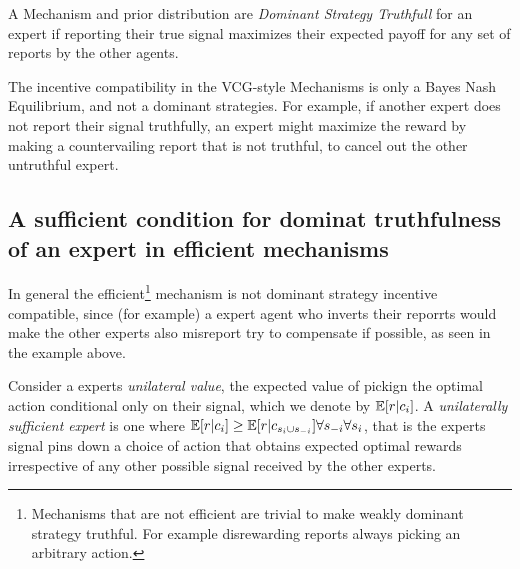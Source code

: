 \begin{defn}
	A Mechanism and prior distribution are \emph{Dominant Strategy Truthfull} for an expert if reporting their true signal maximizes their expected payoff for any set of reports by the other agents. 
\end{defn}

The incentive compatibility in the VCG-style Mechanisms is only a Bayes Nash Equilibrium, and not a dominant strategies. For example, if another expert does not report their signal truthfully, an expert might maximize the reward by making a countervailing report that is not truthful, to cancel out the other untruthful expert. 



\subsection{A sufficient condition for dominat truthfulness of an expert in efficient mechanisms}

In general the efficient\footnote{Mechanisms that are not efficient are trivial to make weakly dominant strategy truthful. For example disrewarding reports always picking an arbitrary action.} mechanism is not dominant strategy incentive compatible, since (for example) a expert agent who inverts their reporrts would make the other experts also misreport try to compensate if possible, as seen in the example above.

Consider a experts \emph{unilateral value}, the expected value of pickign the optimal action conditional only on their signal, which we denote by  $\operatorname*{\mathbb E}[ r| c_{i}]$. A \emph{unilaterally sufficient expert} is one where $\operatorname*{\mathbb E}[r|c_{i}] \geq \operatorname*{\mathbb E}[r|c_{s_i \cup s_{-i}}] \forall s_{-i} \forall s_{i}$, that is the experts signal pins down a choice of action that obtains expected optimal rewards irrespective of any other possible signal received by the other experts.



